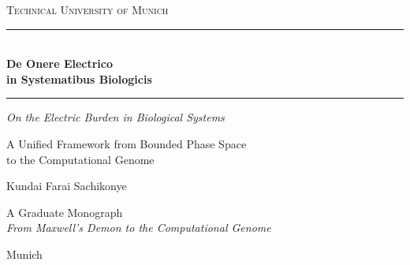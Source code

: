 \begin{titlepage}
\centering
\vspace*{2cm}

{\small\scshape\color{theoryblue} Technical University of Munich}

\vspace{1.5cm}

\rule{\textwidth}{0.6pt}\\[0.4cm]
{\fontsize{28}{34}\selectfont\bfseries\color{theoryblue}
  De Onere Electrico\\[0.2cm]
  in Systematibus Biologicis}\\[0.3cm]
\rule{\textwidth}{0.6pt}

\vspace{0.8cm}

{\Large\itshape On the Electric Burden in Biological Systems}

\vspace{0.5cm}

{\normalsize\color{proofgray}
  A Unified Framework from Bounded Phase Space\\
  to the Computational Genome}

\vspace{2.5cm}

{\Large Kundai Farai Sachikonye}

\vspace{4cm}

{\normalsize
  A Graduate Monograph\\[0.4cm]
  \textit{From Maxwell's Demon to the Computational Genome}
}

\vfill

{\small\color{proofgray} Munich \quad\textbullet\quad \the\year}

\end{titlepage}
